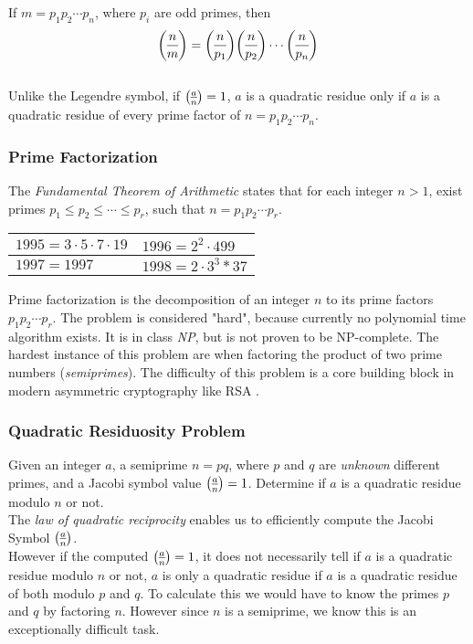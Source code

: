 If $m = p_1p_2 \cdots p_n$, where $p_i$ are odd primes, then
$$\dlegendre{n}{m} = \dlegendre{n}{p_1}\dlegendre{n}{p_2} \cdots\dlegendre{n}{p_n}$$
\\
Unlike the Legendre symbol, if $\legendre{a}{n} = 1$, $a$ is a quadratic residue only if $a$ is a quadratic residue of every prime factor of $n=p_1p_2 \cdots p_n$.

\subsubsection{Prime Factorization}
\cite{andrews1994number} The \textit{Fundamental Theorem of Arithmetic} states that for each integer \newline $n > 1$, exist primes $p_1 \le p_2 \le \cdots \le p_r$, such that $n = p_1 p_2 \cdots p_r$.

\begin{center}
	\begin{tabular}{|l|l|}
		\hline
		$1995 = 3 \cdot 5 \cdot 7 \cdot 19$ & 
		$1996 = 2^2 \cdot 499$ \\
		\hline
		$1997 = 1997$ &
		$1998 = 2 \cdot 3^3 * 37$\\
		\hline
	\end{tabular}
\end{center}


Prime factorization is the decomposition of an integer $n$ to its prime factors $p_1 p_2 \cdots p_r$.
The problem is considered "hard", because currently no polynomial time algorithm exists. It is in class \textit{NP}, but is not proven to be NP-complete.
The hardest instance of this problem are when factoring the product of two prime numbers (\textit{semiprimes}).
The difficulty of this problem is a core building block in modern asymmetric cryptography like RSA \cite{rivest1978method}.

\subsubsection{Quadratic Residuosity Problem}
Given an integer $a$, a semiprime $n = pq$, where $p$ and $q$ are \textit{unknown} different primes, and a Jacobi symbol value $\legendre{a}{n} = 1$.
Determine if $a$ is a quadratic residue modulo $n$ or not.
\bigskip\\
The \textit{law of quadratic reciprocity} enables us to efficiently compute the Jacobi Symbol $\legendre{a}{n}$.\\
However if the computed $\legendre{a}{n} = 1$, it does not necessarily tell if $a$ is a quadratic residue modulo $n$ or not, $a$ is only a quadratic residue if $a$ is a quadratic residue of both modulo $p$ and $q$.
To calculate this we would have to know the primes $p$ and $q$ by factoring $n$. However since $n$ is a semiprime, we know this is an exceptionally  difficult task.

